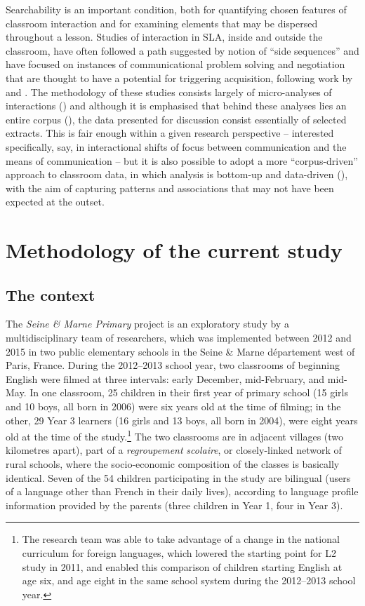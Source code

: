 \documentclass[output=paper,colorlinks,citecolor=brown,modfonts,nonflat]{../langscibook}
\begin{document}
Searchability is an important condition, both for quantifying chosen features of classroom interaction and for examining elements that may be dispersed throughout a lesson. Studies of interaction in SLA, inside and outside the classroom, have often followed a path suggested by  notion of “side sequences” and have focused on instances of communicational problem solving and negotiation that are thought to have a potential for triggering acquisition, following work by \citet{PietroEtAl1989,Vasseur1989} and \citet{Bange1992}. The methodology of these studies consists largely of micro-analyses of interactions (\citealt[7]{Pekarek-Doehler2000}) and although it is emphasised that behind these analyses lies an entire corpus (\citealt[3]{ArdittyVasseur2005}), the data presented for discussion consist essentially of selected extracts. This is fair enough within a given research perspective – interested specifically, say, in interactional shifts of focus between communication and the means of communication – but it is also possible to adopt a more ``corpus-driven'' approach to classroom data, in which analysis is bottom-up and data-driven (\citealt{Tognini-Bonelli2001,Seedhouse2005}), with the aim of capturing patterns and associations that may not have been expected at the outset.

\section{Methodology of the current study}
\subsection{The context}

The \textit{Seine \& Marne Primary} project is an exploratory study by a multidisciplinary team of researchers, which was implemented between 2012 and 2015 in two public elementary schools in the Seine \& Marne département west of Paris, France. During the 2012--2013 school year, two classrooms of beginning English were filmed at three intervals: early December, mid-February, and mid-May. In one classroom, 25 children in their first year of primary school (15 girls and 10 boys, all born in 2006) were six years old at the time of filming; in the other, 29 Year 3 learners (16 girls and 13 boys, all born in 2004), were eight years old at the time of the study.\footnote{The research team was able to take advantage of a change in the national curriculum for foreign languages, which lowered the starting point for L2 study in 2011, and enabled this comparison of children starting English at age six, and age eight in the same school system during the 2012--2013 school year.} The two classrooms are in adjacent villages (two kilometres apart), part of a \textit{regroupement} \textit{scolaire}, or closely-linked network of rural schools, where the socio-economic composition of the classes is basically identical. Seven of the 54 children participating in the study are bilingual (users of a language other than French in their daily lives), according to language profile information provided by the parents (three children in Year 1, four in Year 3).
\end{document}
